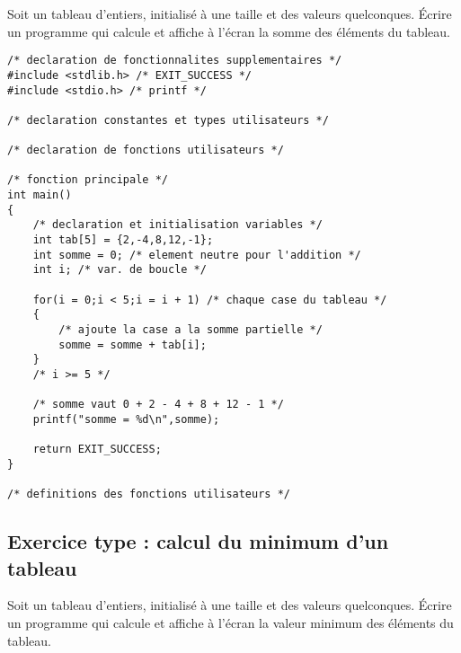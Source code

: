 Soit un tableau d'entiers, initialisé à une taille et des
valeurs quelconques. Écrire un programme qui calcule et affiche à
l'écran la somme des éléments du tableau.

\begin{correction}
\begin{verbatim}
/* declaration de fonctionnalites supplementaires */
#include <stdlib.h> /* EXIT_SUCCESS */
#include <stdio.h> /* printf */

/* declaration constantes et types utilisateurs */

/* declaration de fonctions utilisateurs */

/* fonction principale */
int main()
{
    /* declaration et initialisation variables */
    int tab[5] = {2,-4,8,12,-1};
    int somme = 0; /* element neutre pour l'addition */
    int i; /* var. de boucle */

    for(i = 0;i < 5;i = i + 1) /* chaque case du tableau */
    {
        /* ajoute la case a la somme partielle */
        somme = somme + tab[i];
    }
    /* i >= 5 */

    /* somme vaut 0 + 2 - 4 + 8 + 12 - 1 */
    printf("somme = %d\n",somme);

    return EXIT_SUCCESS;
}

/* definitions des fonctions utilisateurs */
\end{verbatim}
\end{correction}

\subsection{Exercice type : calcul du minimum d'un tableau}

Soit un tableau d'entiers, initialisé à une taille et des
valeurs quelconques. Écrire un programme qui calcule et affiche à
l'écran la valeur minimum des éléments du tableau.

